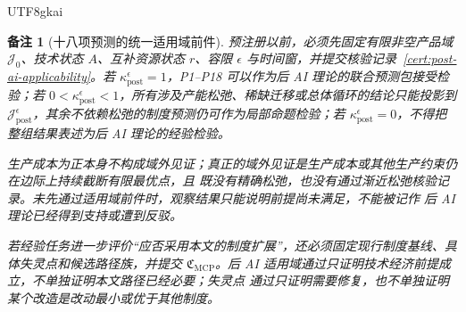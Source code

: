 \documentclass[12pt,a4paper,openany]{report}
\newtheorem{remark}{备注}[chapter]
\newcommand{\Goods}{\mathcal J}
\begin{document}
\begin{CJK*}{UTF8}{gkai}
\begin{remark}[十八项预测的统一适用域前件]
\label{rem:prediction-post-ai-scope}
预注册以前，必须先固定有限非空产品域 \(\Goods_0\)、技术状态 \(A\)、互补资源状态 \(r\)、容限
\(\epsilon\) 与时间窗，并提交核验记录~\ref{cert:post-ai-applicability}。若
\(\kappa_{\mathrm{post}}^\epsilon=1\)，P1--P18 可以作为后 AI 理论的联合预测包接受检验；若
\(0<\kappa_{\mathrm{post}}^\epsilon<1\)，所有涉及产能松弛、稀缺迁移或总体循环的结论只能投影到
\(\Goods_{\mathrm{post}}^\epsilon\)，其余不依赖松弛的制度预测仍可作为局部命题检验；若
\(\kappa_{\mathrm{post}}^\epsilon=0\)，不得把整组结果表述为后 AI 理论的经验检验。

生产成本为正本身不构成域外见证；真正的域外见证是生产成本或其他生产约束仍在边际上持续截断有限最优点，且
既没有精确松弛，也没有通过渐近松弛核验记录。未先通过适用域前件时，观察结果只能说明前提尚未满足，不能被记作
后 AI 理论已经得到支持或遭到反驳。

若经验任务进一步评价“应否采用本文的制度扩展”，还必须固定现行制度基线、具体失灵点和候选路径族，并提交
\(\mathfrak C_{\mathrm{MCP}}\)。后 AI 适用域通过只证明技术经济前提成立，不单独证明本文路径已经必要；失灵点
通过只证明需要修复，也不单独证明某个改造是改动最小或优于其他制度。
\end{remark}


\end{CJK*}
\end{document}

